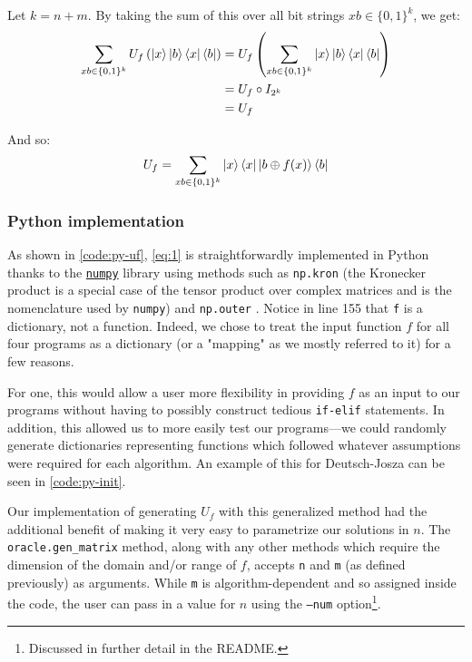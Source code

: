 \documentclass[12pt]{article}
\begin{document}
Let $k = n+m$. By taking the sum of this over all bit strings $xb \in \{0,1\}^k$, we get:
\begin{align*}
    \sum_{xb \in \{0,1\}^{k}}U_f\left(\ket{x}\ket{b}\bra{x}\bra{b}\right)
        &= U_f \left(\sum_{xb \in \{0,1\}^{k}}\ket{x}\ket{b}\bra{x}\bra{b}\right) \\
        &= U_f \circ I_{2^{k}} \\
        &= U_f
\end{align*}

And so:
\begin{equation}\label{eq:1}
        U_f = \sum_{xb \in \{0,1\}^{k}}\ket{x}\bra{x} \ket{b \oplus f(x)}\bra{b}
\end{equation}

\subsubsection{Python implementation}

As shown in \autoref{code:py-uf}, \autoref{eq:1} is straightforwardly implemented in Python thanks to the \href{https://numpy.org/}{\texttt{numpy}} library using methods such as \texttt{np.kron} (the Kronecker product is a special case of the tensor product over complex matrices and is the nomenclature used by \texttt{numpy}) and \texttt{np.outer} \cite{numpy}.
Notice in line 155 that \texttt{f} is a dictionary, not a function.
Indeed, we chose to treat the input function $f$ for all four programs as a dictionary (or a "mapping" as we mostly referred to it) for a few reasons.

For one, this would allow a user more flexibility in providing $f$ as an input to our programs without having to possibly construct tedious \texttt{if-elif} statements.
In addition, this allowed us to more easily test our programs---we could randomly generate dictionaries representing functions which followed whatever assumptions were required for each algorithm.
An example of this for Deutsch-Josza can be seen in \autoref{code:py-init}.

Our implementation of generating $U_f$ with this generalized method had the additional benefit of making it very easy to parametrize our solutions in $n$.
The \texttt{oracle.gen\_matrix} method, along with any other methods which require the dimension of the domain and/or range of $f$, accepts \texttt{n} and \texttt{m} (as defined previously) as arguments.
While \texttt{m} is algorithm-dependent and so assigned inside the code, the user can pass in a value for $n$ using the \texttt{--num} option\footnote{Discussed in further detail in the README.}.
\end{document}
